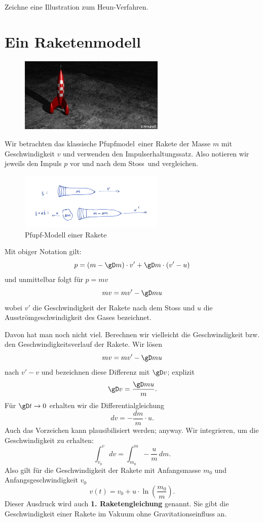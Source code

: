 \documentclass[%
11pt,%
twoside,%
titlepage,%
german,%
headsepline%
]{scrartcl}
\begin{document}
\begin{ueb}
Zeichne eine Illustration zum Heun-Verfahren.
\end{ueb}

\newpage

\section{Ein Raketenmodell}
\begin{figure}
  \begin{center}
    \includegraphics[width=0.618\textwidth]{pictures/raketetim}
  \end{center}
\end{figure}

Wir betrachten das klassische \glqq Pfupfmodel\grqq\ einer Rakete der Masse $m$ mit Geschwindigkeit $v$ und verwenden den Impulserhaltungssatz. Also notieren wir jeweils den Impuls $p$ vor und nach dem \glqq Stoss\grqq\ und vergleichen.

\begin{figure}[h!]
  \begin{center}
    \includegraphics[width=0.618\textwidth]{pictures/raketeimpuls}
  \end{center}
\caption{Pfupf-Modell einer Rakete}
\end{figure}

Mit obiger Notation gilt:
$$p=(m-\gD m)\cdot v'+\gD m\cdot(v'-u)$$
und unmittelbar folgt f\"ur $p=mv$
$$mv=mv'-\gD mu$$
wobei $v'$ die Geschwindigkeit der Rakete nach dem Stoss und $u$ die Ausstr\"omgeschwindigkeit des Gases bezeichnet.

Davon hat man noch nicht viel. Berechnen wir vielleicht die Geschwindigkeit bzw. den Geschwindigkeitsverlauf der Rakete. Wir l\"osen
$$mv=mv'-\gD mu$$
nach $v'-v$ und bezeichnen diese Differenz mit $\gD v$; explizit
$$\gD v=\frac{\gD mu}{m}.$$
F\"ur $\gD t\to0$ erhalten wir die Differentialgleichung
$$dv=-\frac{dm}{m}\cdot u.$$
Auch das Vorzeichen kann plausibilisiert werden; anyway. Wir integrieren, um die Geschwindigkeit zu erhalten:
$$\int_{v_0}^v\,dv=\int_{m_0}^m-\frac{u}{m}\,dm.$$
Also gilt f\"ur die Geschwindigkeit der Rakete mit Anfangsmasse $m_0$ und Anfangsgeschwindigkeit $v_0$
$$v(t)=v_0+u\cdot\ln\left(\frac{m_0}{m}\right).$$
Dieser Ausdruck wird auch \textbf{1. Raketengleichung} genannt. Sie gibt die Geschwindigkeit einer Rakete im Vakuum ohne Gravitationseinfluss an.
\end{document}
